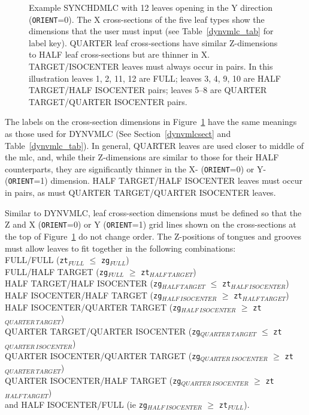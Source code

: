 \documentclass[12pt,twoside]{article}
\begin{document}
\begin{figure}[htpb]
\begin{center}
\begin{htmlonly}
\end{htmlonly}
\end{center}
\vspace*{-1.0cm}
\caption[SYNCHDMLC CM geometry]
{Example SYNCHDMLC with 12 leaves opening in the Y
direction ({\tt ORIENT}=0). The X cross-sections of the five
leaf types show the dimensions that the
user must input (see Table~\ref{dynvmlc_tab} for label key).
QUARTER leaf cross-sections have similar Z-dimensions
to HALF leaf cross-sections but are thinner in X.
TARGET/ISOCENTER leaves must always occur in pairs.
In this illustration leaves 1, 2, 11, 12 are FULL; leaves 3, 4, 9, 10
are HALF TARGET/HALF ISOCENTER pairs; leaves 5--8 are QUARTER TARGET/QUARTER ISOCENTER
pairs.}
\label{synchdmlc_fig}
\end{figure}

The labels on the cross-section dimensions in Figure~\ref{synchdmlc_fig}
have the same meanings as those used for DYNVMLC (See Section~\ref{dynvmlcsect} and
Table~\ref{dynvmlc_tab}).  In general, QUARTER leaves
are used closer to middle of the mlc, and, while their Z-dimensions are similar to those for their HALF counterparts, they
are significantly thinner in the X- ({\tt ORIENT}=0) or Y- ({\tt ORIENT}=1)
dimension.  HALF TARGET/HALF ISOCENTER leaves must occur in pairs, as must QUARTER TARGET/QUARTER ISOCENTER leaves.

Similar to DYNVMLC, leaf cross-section dimensions must be defined so that the Z and X ({\tt ORIENT}=0) or Y ({\tt ORIENT}=1) grid lines
shown on the cross-sections at the top of Figure~\ref{synchdmlc_fig} do not change order.
The Z-positions of tongues and grooves must allow leaves to fit
together in the following
combinations: \\
FULL/FULL ({\tt zt}$_{FULL}$ $\leq$ {\tt zg}$_{FULL}$)\\
FULL/HALF TARGET ({\tt zg}$_{FULL}$ $\geq$ {\tt zt}$_{HALF~TARGET}$)\\
HALF TARGET/HALF ISOCENTER ({\tt zg}$_{HALF~TARGET}$ $\leq$ {\tt zt}$_{HALF~ISOCENTER}$)\\
HALF ISOCENTER/HALF TARGET ({\tt zg}$_{HALF~ISOCENTER}$ $\geq$ {\tt zt}$_{HALF~TARGET}$)\\
HALF ISOCENTER/QUARTER TARGET ({\tt zg}$_{HALF~ISOCENTER}$ $\geq$ {\tt zt}$_{QUARTER~TARGET}$)\\
QUARTER TARGET/QUARTER ISOCENTER ({\tt zg}$_{QUARTER~TARGET}$ $\leq$ {\tt zt}$_{QUARTER~ISOCENTER}$)\\
QUARTER ISOCENTER/QUARTER TARGET ({\tt zg}$_{QUARTER~ISOCENTER}$ $\geq$ {\tt zt}$_{QUARTER~TARGET}$)\\
QUARTER ISOCENTER/HALF TARGET ({\tt zg}$_{QUARTER~ISOCENTER}$ $\geq$ {\tt zt}$_{HALF~TARGET}$)\\
and HALF ISOCENTER/FULL (ie {\tt zg}$_{HALF~ISOCENTER}$ $\geq$ {\tt zt}$_{FULL}$).
\end{document}
